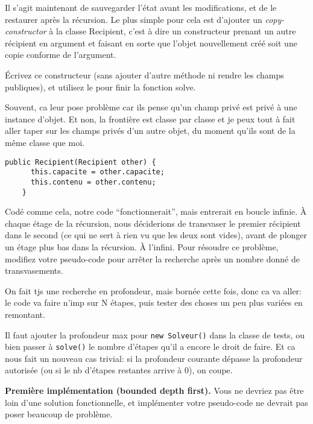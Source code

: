 \documentclass[10pt]{article}\usepackage[correction,nu]{esial}%
\begin{document}
\medskip
Il s'agit maintenant de sauvegarder l'état avant les modifications,
et de le restaurer après la récursion. Le plus simple pour cela est d'ajouter
un \textit{copy-constructor} à la classe Recipient, c'est à dire un
constructeur prenant un autre récipient en argument et faisant en sorte que
l'objet nouvellement créé soit une copie conforme de l'argument. 

\Question Écrivez ce constructeur (sans ajouter d'autre méthode ni rendre les
champs publiques), et utilisez le pour finir la fonction solve.

\begin{Reponse}
  Souvent, ca leur pose problème car ils pense qu'un champ privé est privé à
  une instance d'objet. Et non, la frontière est classe par classe et je peux
  tout à fait aller taper sur les champs privés d'un autre objet, du moment
  qu'ils sont de la même classe que moi.

  \begin{Verbatim}[gobble=4]
    public Recipient(Recipient other) {
      this.capacite = other.capacite;
      this.contenu = other.contenu;
    }
  \end{Verbatim}
\end{Reponse}

\medskip
Codé comme cela, notre code ``fonctionnerait'', mais entrerait en
boucle infinie. À chaque étage de la récursion, nous déciderions de transvaser
le premier récipient dans le second (ce qui ne sert à rien vu que les deux sont
vides), avant de plonger un étage plus bas dans la récursion. À l'infini.
\Question Pour résoudre ce problème, modifiez votre pseudo-code pour arrêter la
recherche après un nombre donné de transvasements.

\begin{Reponse}
  On fait tjs une recherche en profondeur, mais bornée cette fois, donc ca va
  aller: le code va faire n'imp sur N étapes, puis tester des choses un peu
  plus variées en remontant.

  Il faut ajouter la profondeur max pour \texttt{new Solveur()} dans la classe
  de tests, ou bien passer à \texttt{solve()} le nombre d'étapes qu'il a encore
  le droit de faire. Et ca nous fait un nouveau cas trivial: si la profondeur
  courante dépasse la profondeur autorisée (ou si le nb d'étapes restantes
  arrive à 0), on coupe.
\end{Reponse}

\Exercice\textbf{Première implémentation (bounded depth first).}  
\Question Vous ne devriez pas être loin d'une solution fonctionnelle, et
implémenter votre pseudo-code ne devrait pas poser beaucoup de problème.
\end{document}

